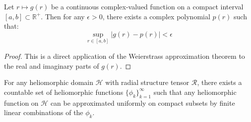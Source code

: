 \begin{lemma}
Let $r \mapsto g(r)$ be a continuous complex-valued function on a compact interval $[a, b] \subset \mathbb{R}^+$. Then for any $\epsilon > 0$, there exists a complex polynomial $p(r)$ such that:
\begin{equation}
\sup_{r \in [a, b]} |g(r) - p(r)| < \epsilon
\end{equation}
\end{lemma}

\begin{proof}
This is a direct application of the Weierstrass approximation theorem to the real and imaginary parts of $g(r)$.
\end{proof}

\begin{lemma}
For any heliomorphic domain $\mathcal{H}$ with radial structure tensor $\mathcal{R}$, there exists a countable set of heliomorphic functions $\{\phi_k\}_{k=1}^{\infty}$ such that any heliomorphic function on $\mathcal{H}$ can be approximated uniformly on compact subsets by finite linear combinations of the $\phi_k$.
\end{lemma}


